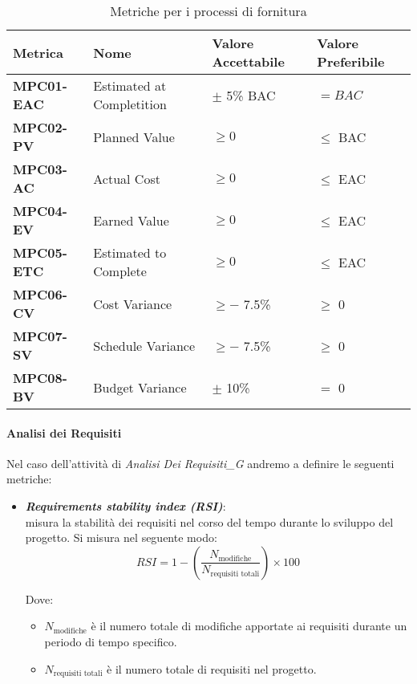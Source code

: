 \begin{table}[htbp]
    \centering
    \begin{tabular}{|>{\centering\arraybackslash}p{3cm}|p{5cm}|p{4cm}|p{4cm}|}
    \hline
    \rowcolor{gray!30}
    \textbf{Metrica} & \textbf{Nome} & \textbf{Valore Accettabile} & \textbf{Valore Preferibile} \\
    \hline
    \rowcolor{gray!10}
    \textbf{MPC01-EAC} & Estimated at Completition & $\pm$ 5\% BAC & $=BAC$ \\
    \hline
    \rowcolor{gray!10}
    \textbf{MPC02-PV} & Planned Value & $\geq 0$ & $\leq$ BAC \\
    \hline
    \rowcolor{gray!10}
    \textbf{MPC03-AC} & Actual Cost & $\geq 0$ & $\leq$ EAC \\
    \hline
    \rowcolor{gray!10}
    \textbf{MPC04-EV} & Earned Value & $\geq 0$ & $\leq$ EAC \\
    \hline
    \rowcolor{gray!10}
    \textbf{MPC05-ETC} & Estimated to Complete & $\geq 0$ & $\leq$ EAC \\
    \hline
    \rowcolor{gray!10}
    \textbf{MPC06-CV} & Cost Variance & $\geq -$ 7.5\% & $\geq$ 0 \\
    \hline
    \rowcolor{gray!10}
    \textbf{MPC07-SV} & Schedule Variance & $\geq -$ 7.5\% & $\geq$ 0 \\
    \hline
    \rowcolor{gray!10}
    \textbf{MPC08-BV} & Budget Variance & $\pm$ 10\% & $=$ 0 \\
    \hline
    \end{tabular}
    \caption{Metriche per i processi di fornitura}
    \label{tab:metriche_fornitura}
\end{table}


\paragraph{Analisi dei Requisiti}
Nel caso dell'attività di \textit{Analisi Dei Requisiti_G} andremo a definire le seguenti metriche:
\begin{itemize}
    \item \textbf{\emph{Requirements stability index (RSI)}}:\\
    misura la stabilità dei requisiti nel corso del tempo durante lo sviluppo del progetto. Si misura nel seguente modo:
    \[
    RSI = 1 - \left( \frac{N_{\text{modifiche}}}{N_{\text{requisiti totali}}} \right) \times 100
    \]

    Dove:
    \begin{itemize}
        \item \(N_{\text{modifiche}}\) è il numero totale di modifiche apportate ai requisiti durante un periodo di tempo specifico.
        \item \(N_{\text{requisiti totali}}\) è il numero totale di requisiti nel progetto.
    \end{itemize}
\end{itemize}

